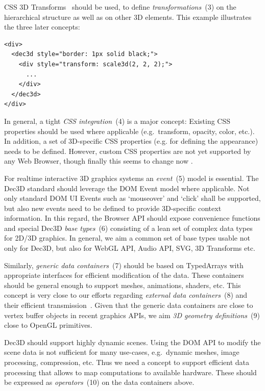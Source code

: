 \documentclass{acmsiggraph}
\begin{document}
CSS 3D Transforms~\cite{webkit3DCSS} should be used, to define \textit{transformations}~(3) on the hierarchical structure as well as on other 3D elements. This example illustrates the three later concepts:

\small
\begin{verbatim}
<div>
  <dec3d style="border: 1px solid black;">
    <div style="transform: scale3d(2, 2, 2);">
      ...
    </div>
  </dec3d>
</div>
\end{verbatim}
\normalsize

In general, a tight \textit{CSS integration}~(4) is a major concept: Existing CSS properties should be used where applicable (e.g.\ transform, opacity, color, etc.). In addition, a set of 3D-specific CSS properties (e.g. for defining the appearance) needs to be defined. However, custom CSS properties are not yet supported by any Web Browser, though finally this seems to change now \cite{CSSCustom}.

For realtime interactive 3D graphics systems an \textit{event}~(5) model is essential. The Dec3D standard should leverage the DOM Event model where applicable. Not only standard DOM UI Events such as `mouseover' and `click' shall be supported, but also new events need to be defined to provide 3D-specific context information. In this regard, the Browser API should expose convenience functions and special Dec3D \textit{base types}~(6) consisting of a lean set of complex data types for 2D/3D graphics. In general, we aim a common set of base types usable not only for Dec3D, but also for WebGL API, Audio API, SVG, 3D Transforms etc.

Similarly, \textit{generic data containers}~(7) should be based on TypedArrays \cite{TypArr12} with appropriate interfaces for efficient modification of the data. These containers should be general enough to support meshes, animations, shaders, etc. This concept is very close to our efforts regarding \textit{external data containers}~(8) and their efficient transmission~\cite{Behr12,Trevett12}. Given that the generic data containers are close to vertex buffer objects in recent graphics APIs, we aim \textit{3D geometry definitions}~(9) close to OpenGL primitives.

Dec3D should support highly dynamic scenes. Using the DOM API to modify the scene data is not sufficient for many use-cases, e.g.\ dynamic meshes, image processing, compression, etc. Thus we need a concept to support efficient data processing that allows to map computations to available hardware. These should be expressed as \textit{operators}~(10) on the data containers above.
\end{document}
